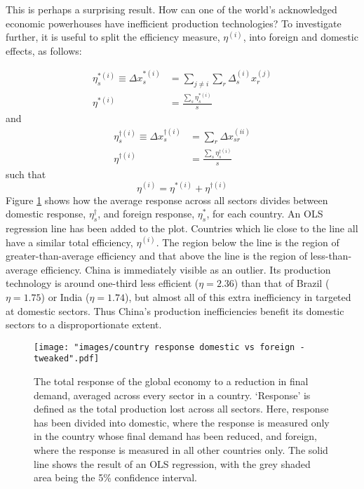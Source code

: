 \documentclass[a4paper]{article}
\begin{document}
This is perhaps a surprising result.
How can one of the world's acknowledged economic powerhouses have inefficient production technologies?
To investigate further, it is useful to split the efficiency measure, $\eta^{(i)}$, into foreign and domestic effects, as follows:

\begin{align}
\eta_s^{*(i)} \equiv \Delta x_{s}^{*(i)} & = 
	\sum_{j \neq i} \sum_r \Delta_{s}^{(i)} x_{r}^{(j)} \\
\eta^{*(i)} & = 
	\frac{\sum_s \eta_s^{*(i)}}{s}
\end{align}
and
\begin{align}
\eta_s^{\dagger(i)} \equiv \Delta x_{s}^{\dagger(i)} & = 
	\sum_r \Delta x_{sr}^{(ii)} \\
\eta^{\dagger(i)} & = 
	\frac{\sum_s \eta_s^{\dagger(i)}}{s}
\end{align}
such that
\begin{equation}
\eta^{(i)} = \eta^{*(i)} + \eta^{\dagger(i)}
\end{equation}
Figure \ref{fig:countries_domestic_vs_foreign} shows how the average response across all sectors divides between domestic response, $\eta_s^{\dagger}$, and foreign response, $\eta_s^{*}$, for each country. 
An OLS regression line has been added to the plot.
Countries which lie close to the line all have a similar total efficiency, $\eta^{(i)}$.
The region below the line is the region of greater-than-average efficiency and that above the line is the region of less-than-average efficiency.
China is immediately visible as an outlier.
Its production technology is around one-third less efficient ($\eta = 2.36$) than that of Brazil ($\eta = 1.75$) or India ($\eta = 1.74$), but almost all of this extra inefficiency in targeted at domestic sectors.
Thus China's production inefficiencies benefit its domestic sectors to a disproportionate extent.

\begin{figure}
\centering
\texttt{[image: "images/country response domestic vs foreign - tweaked".pdf]}
\caption{The total response of the global economy to a reduction in final demand, averaged across every sector in a country. 
`Response' is defined as the total production lost across all sectors.
Here, response has been divided into domestic, where the response is measured only in the country whose final demand has been reduced, and foreign, where the response is measured in all other countries only.
The solid line shows the result of an OLS regression, with the grey shaded area being the 5\% confidence interval.}
\label{fig:countries_domestic_vs_foreign}
\end{figure}
\end{document}
